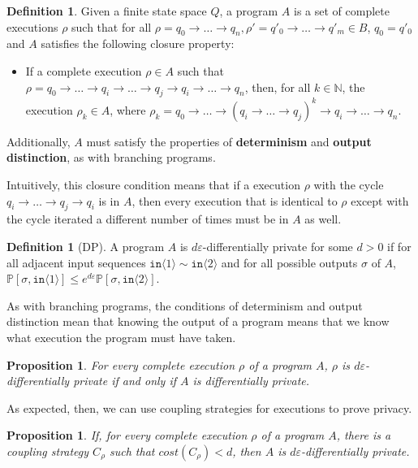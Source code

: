 \documentclass[12pt]{article}
\newcommand{\NN}{\mathbb{N}}
\newcommand{\PP}{\mathbb{P}}
\newcommand{\brangle}[1]{\langle #1 \rangle}
\newtheorem{prop}[thm]{Proposition}
\theoremstyle{definition}
\newtheorem{defn}[thm]{Definition}
\begin{document}
\begin{defn}
    Given a finite state space $Q$, a program $A$ is a set of complete executions $\rho$ such that for all $\rho=q_0\to\ldots\to q_n, \rho'=q'_0\to\ldots\to q'_m\in B$, $q_0=q'_0$ and $A$ satisfies the following closure property:\begin{itemize}
        \item If a complete execution $\rho\in A$ such that $\rho = q_0\to \ldots \to q_i \to \ldots \to q_j \to q_i\to \ldots \to q_n$, then, for all $k\in \NN$, the execution $\rho_k\in A$, where $\rho_k = q_0\to \ldots \to (q_i \to \ldots \to q_j)^k \to q_i\to \ldots \to q_n$.
    \end{itemize}
    Additionally, $A$ must satisfy the properties of \textbf{determinism} and \textbf{output distinction}, as with branching programs. 
\end{defn}

Intuitively, this closure condition means that if a execution $\rho$ with the cycle $q_i\to \ldots \to q_j\to q_i$ is in $A$, then every execution that is identical to $\rho$ except with the cycle iterated a different number of times must be in $A$ as well. 

\begin{defn}[DP]
    A program $A$ is $d\varepsilon$-differentially private for some $d>0$ if for all adjacent input sequences $\texttt{in}\brangle{1}\sim \texttt{in}\brangle{2}$ and for all possible outputs $\sigma$ of $A$, $\PP[\sigma, \texttt{in}\brangle{1}]\leq e^{d\varepsilon}\PP[\sigma, \texttt{in}\brangle{2}]$.
\end{defn}

As with branching programs, the conditions of determinism and output distinction mean that knowing the output of a program means that we know what execution the program must have taken. 

\begin{prop}
    For every complete execution $\rho$ of a program $A$, $\rho$ is $d\varepsilon$-differentially private if and only if $A$ is differentially private. 
\end{prop}

As expected, then, we can use coupling strategies for executions to prove privacy.

\begin{prop}
    If, for every complete execution $\rho$ of a program $A$, there is a coupling strategy $C_\rho$ such that $cost(C_\rho)<d$, then $A$ is $d\varepsilon$-differentially private.
\end{prop}
\end{document}
